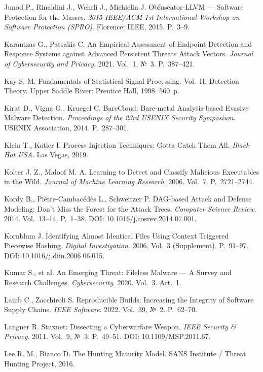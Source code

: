  Junod P., Rinaldini J., Wehrli J., Michielin J. Obfuscator-LLVM --- Software Protection for the Masses. \emph{2015 IEEE/ACM 1st International Workshop on Software Protection (SPRO)}. Florence: IEEE, 2015. P.~3--9.

 Karantzas G., Patsakis C. An Empirical Assessment of Endpoint Detection and Response Systems against Advanced Persistent Threats Attack Vectors. \emph{Journal of Cybersecurity and Privacy}. 2021. Vol.~1, №~3. P.~387--421.

 Kay S. M. Fundamentals of Statistical Signal Processing. Vol.~II: Detection Theory. Upper Saddle River: Prentice Hall, 1998. 560~p.

 Kirat D., Vigna G., Kruegel C. BareCloud: Bare-metal Analysis-based Evasive Malware Detection. \emph{Proceedings of the 23rd USENIX Security Symposium}. USENIX Association, 2014. P.~287--301.

 Klein T., Kotler I. Process Injection Techniques: Gotta Catch Them All. \emph{Black Hat USA}. Las Vegas, 2019.

 Kolter J. Z., Maloof M. A. Learning to Detect and Classify Malicious Executables in the Wild. \emph{Journal of Machine Learning Research}. 2006. Vol.~7. P.~2721--2744.

 Kordy B., Piètre-Cambacédès L., Schweitzer P. DAG-based Attack and Defense Modeling: Don't Miss the Forest for the Attack Trees. \emph{Computer Science Review}. 2014. Vol.~13--14. P.~1--38. DOI: 10.1016/j.cosrev.2014.07.001.

 Kornblum J. Identifying Almost Identical Files Using Context Triggered Piecewise Hashing. \emph{Digital Investigation}. 2006. Vol.~3 (Supplement). P.~91--97. DOI: 10.1016/j.diin.2006.06.015.

 Kumar S., et al. An Emerging Threat: Fileless Malware --- A Survey and Research Challenges. \emph{Cybersecurity}. 2020. Vol.~3. Art.~1.

 Lamb C., Zacchiroli S. Reproducible Builds: Increasing the Integrity of Software Supply Chains. \emph{IEEE Software}. 2022. Vol.~39, №~2. P.~62--70.

 Langner R. Stuxnet: Dissecting a Cyberwarfare Weapon. \emph{IEEE Security \& Privacy}. 2011. Vol.~9, №~3. P.~49--51. DOI: 10.1109/MSP.2011.67.

 Lee R. M., Bianco D. The Hunting Maturity Model. SANS Institute / Threat Hunting Project, 2016.

